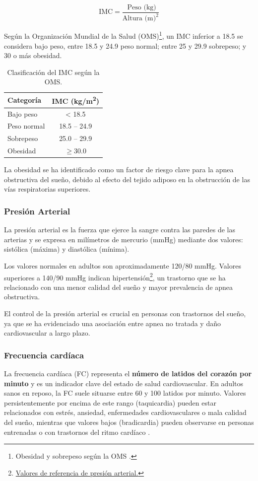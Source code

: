 \begin{equation}
    \text {IMC}=\frac{\text { Peso (kg)}}{\text {Altura (m)}^2} 
\end{equation}

Según la Organización Mundial de la Salud (OMS)\footnote{Obesidad y sobrepeso según la OMS \cite{oms_obesidad_2024}.}, un IMC inferior a 18.5 se considera bajo peso, entre 18.5 y 24.9 peso normal; entre 25 y 29.9 sobrepeso; y 30 o más obesidad.
\begin{table}[H]
\centering
\begin{tabular}{|l|c|}
\hline
\textbf{Categoría} & \textbf{IMC (kg/m\textsuperscript{2})} \\
\hline
Bajo peso & < 18.5 \\
Peso normal & 18.5 – 24.9 \\
Sobrepeso & 25.0 – 29.9 \\
Obesidad & $\geq 30.0$ \\
\hline
\end{tabular}
\caption{Clasificación del IMC según la OMS.}
\label{tab:clasificacion_imc}
\end{table}


La obesidad se ha identificado como un factor de riesgo clave para la apnea obstructiva del sueño, debido al efecto del tejido adiposo en la obstrucción de las vías respiratorias superiores.

 \subsubsection{Presión Arterial}
 La presión arterial es la fuerza que ejerce la sangre contra las paredes de las arterias y se expresa en milímetros de mercurio (mmHg) mediante dos valores: sistólica (máxima) y diastólica (mínima).

 Los valores normales en adultos son aproximadamente 120/80 mmHg. Valores superiores a 140/90 mmHg indican hipertensión\footnote{\href{https://enfermeriaencardiologia.com/salud-cardiovascular/prevencion/factores-de-riesgo/presion-arterial}{Valores de referencia de presión arterial.}}, un trastorno que se ha relacionado con una menor calidad del sueño y mayor prevalencia de apnea obstructiva.

 El control de la presión arterial es crucial en personas con trastornos del sueño, ya que se ha evidenciado una asociación entre apnea no tratada y daño cardiovascular a largo plazo.

 \subsubsection{Frecuencia cardíaca}
 La frecuencia cardíaca (FC) representa el \textbf{número de latidos del corazón por minuto} y es un indicador clave del estado de salud cardiovascular. En adultos sanos en reposo, la FC suele situarse entre 60 y 100 latidos por minuto. Valores persistentemente por encima de este rango (taquicardia) pueden estar relacionados con estrés, ansiedad, enfermedades cardiovasculares o mala calidad del sueño, mientras que valores bajos (bradicardia) pueden observarse en personas entrenadas o con trastornos del ritmo cardíaco \cite{heartRate}.

